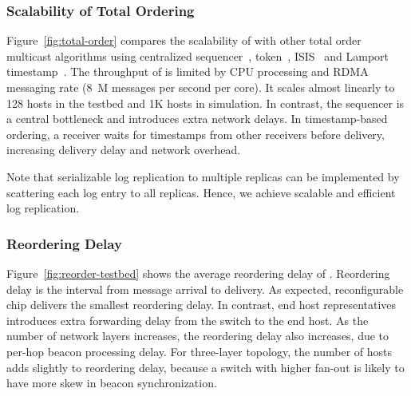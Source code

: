 \subsubsection{Scalability of Total Ordering}\label{subsubsec:scalability}
Figure~\ref{fig:total-order} compares the scalability of \sys with other total order multicast algorithms using centralized sequencer~\cite{eris,kaminsky2016design}, token~\cite{rajagopalan1989token}, ISIS~\cite{birman1985replication} and Lamport timestamp~\cite{lamport1978time}. The throughput of \sys is limited by CPU processing and RDMA messaging rate (8~M messages per second per core).
It scales almost linearly to 128 hosts in the testbed and 1K hosts in simulation. In contrast, the sequencer is a central bottleneck and introduces extra network delays. In timestamp-based ordering, a receiver waits for timestamps from other receivers before delivery, increasing delivery delay and network overhead. 

Note that serializable log replication to multiple replicas can be implemented by scattering each log entry to all replicas. Hence, we achieve scalable and efficient log replication.







\subsubsection{Reordering Delay}
\label{sec:eval-delay}

Figure~\ref{fig:reorder-testbed} shows the average reordering delay of \sys.
Reordering delay is the interval from message arrival to delivery. As expected, reconfigurable chip delivers the smallest reordering delay. In contrast, end host representatives introduces extra forwarding delay from the switch to the end host. As the number of network layers increases, the reordering delay also increases, due to per-hop beacon processing delay.
For three-layer topology, the number of hosts adds slightly to reordering delay, because a switch with higher fan-out is likely to have more skew in beacon synchronization.

